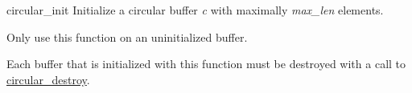 \begin{DoxyDocu}{circular\_init}
\label{circular_8h_abd02fffdac28d268a37c6bfd5c6e2fb5_abd02fffdac28d268a37c6bfd5c6e2fb5}
Initialize a circular buffer {\itshape c} with maximally {\itshape max\_len} elements.

Only use this function on an uninitialized buffer.

Each buffer that is initialized with this function must be destroyed with a call to \hyperlink{circular_8h_add0c91d4bec47d2d74394c1772d2d9d0_add0c91d4bec47d2d74394c1772d2d9d0}{circular\_destroy}.

\end{DoxyDocu}
